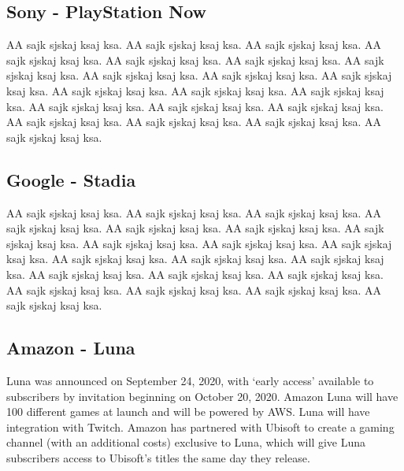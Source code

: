 \subsection{Sony - PlayStation Now}
AA sajk sjskaj ksaj ksa. AA sajk sjskaj ksaj ksa. AA sajk sjskaj ksaj ksa. AA sajk sjskaj ksaj ksa. AA sajk sjskaj ksaj ksa. AA sajk sjskaj ksaj ksa. AA sajk sjskaj ksaj ksa. AA sajk sjskaj ksaj ksa. AA sajk sjskaj ksaj ksa. AA sajk sjskaj ksaj ksa. AA sajk sjskaj ksaj ksa. AA sajk sjskaj ksaj ksa. AA sajk sjskaj ksaj ksa. AA sajk sjskaj ksaj ksa. AA sajk sjskaj ksaj ksa. AA sajk sjskaj ksaj ksa. AA sajk sjskaj ksaj ksa. AA sajk sjskaj ksaj ksa. AA sajk sjskaj ksaj ksa. AA sajk sjskaj ksaj ksa\cite{PlayStation_Now}.
\subsection{Google - Stadia}
AA sajk sjskaj ksaj ksa. AA sajk sjskaj ksaj ksa. AA sajk sjskaj ksaj ksa. AA sajk sjskaj ksaj ksa. AA sajk sjskaj ksaj ksa. AA sajk sjskaj ksaj ksa. AA sajk sjskaj ksaj ksa. AA sajk sjskaj ksaj ksa. AA sajk sjskaj ksaj ksa. AA sajk sjskaj ksaj ksa. AA sajk sjskaj ksaj ksa. AA sajk sjskaj ksaj ksa. AA sajk sjskaj ksaj ksa. AA sajk sjskaj ksaj ksa. AA sajk sjskaj ksaj ksa. AA sajk sjskaj ksaj ksa. AA sajk sjskaj ksaj ksa. AA sajk sjskaj ksaj ksa. AA sajk sjskaj ksaj ksa. AA sajk sjskaj ksaj ksa\cite{Google_Stadia}.
\subsection{Amazon - Luna}
Luna was announced on September 24, 2020, with ‘early access’ available to subscribers by invitation beginning on October 20, 2020. Amazon Luna will have 100 different games at launch and will be powered by AWS. Luna will have integration with Twitch. Amazon has partnered with Ubisoft to create a gaming channel (with an additional costs) exclusive to Luna, which will give Luna subscribers access to Ubisoft's titles the same day they release\cite{Amazon_Luna}.